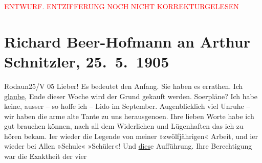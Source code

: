
\begin{center}
            \textcolor{red}{ENTWURF. ENTZIFFERUNG NOCH NICHT KORREKTURGELESEN}
                      \end{center}
            
               \section[Richard Beer-Hofmann an Arthur Schnitzler, 25. 5. 1905]{ Richard Beer-Hofmann an Arthur Schnitzler,
               25. 5. 1905}\nopagebreak{}\rehead{ }\begin{ledgroupsized}[t]{13cm}\normalsize\beginnumbering{} \toendnotes[C]{\smallbreak\pagebreak[2]} 
\toendnotes[C]{\smallbreak}\pstart
           \raggedleft{}{\pb}Rodaun25/V 05\pend
           \pstart
           Lieber! Es bedeutet den Anfang. Sie haben es errathen. Ich \uline{glaube}, Ende dieser Woche wird der Grund gekauft
               werden. So{\geminationm}erpläne? Ich habe keine, ausser – so hoffe
               ich – Lido im September. Augenblicklich
               viel Unruhe – wir haben die arme alte Tante zu uns herausgeno{\geminationm}en.\pend
           \pstart
           Ihre lieben Worte habe ich gut brauchen können, nach all dem Widerlichen und
               Lügenhaften das ich zu hören bekam. I{\geminationm}er wieder die
               Legende von meiner »zwölf{\pb}jährigen«
               Arbeit, und i{\geminationm}er wieder bei Allen »Schule« »Schüler«!
               Und \uline{dies}e Aufführung. Ihre Berechtigung war die Exaktheit der vier

\end{ledgroupsized}

